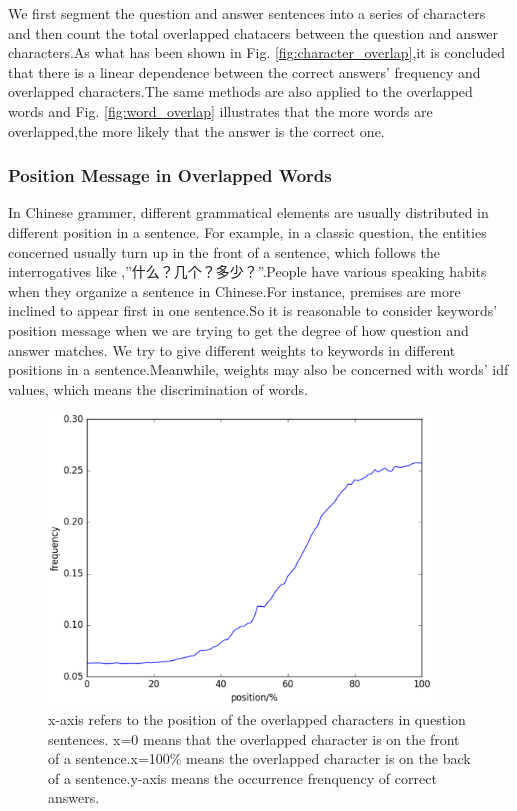 \documentclass{llncs}
\begin{document}
We first segment the question and answer sentences into a series of characters and then count the total overlapped chatacers between the question and answer characters.As what has been shown in Fig. \ref{fig:character_overlap},it is concluded that there is a linear dependence between the correct answers’ frequency and overlapped characters.The same methods are also applied to the overlapped words and Fig. \ref{fig:word_overlap} illustrates that the more words are overlapped,the more likely that the answer is the correct one.

\subsubsection{Position Message in Overlapped Words}
In Chinese grammer, different grammatical elements are usually distributed in different position in a sentence. For example, in a classic question, the entities concerned usually turn up in the front of a sentence, which follows the interrogatives like ,”什么？几个？多少？”.People have various speaking habits when they organize a sentence in Chinese.For instance, premises are more inclined to appear first in one sentence.So it is reasonable to consider keywords’ position message when we are trying to get the degree of how question and answer matches. We try to give different weights to keywords in different positions in a sentence.Meanwhile, weights may also be concerned with words’ idf values, which means the discrimination of words.

\begin{figure}
\centering
\includegraphics[width=4in]{figures/character_position.eps}
\caption{x-axis refers to the position of the overlapped characters in question sentences. x=0 means that the overlapped character is on the front of  a sentence.x=100\% means the overlapped character is on the back of a sentence.y-axis means the occurrence frenquency of correct answers.}
\label{fig:character_position}
\end{figure}
\end{document}
